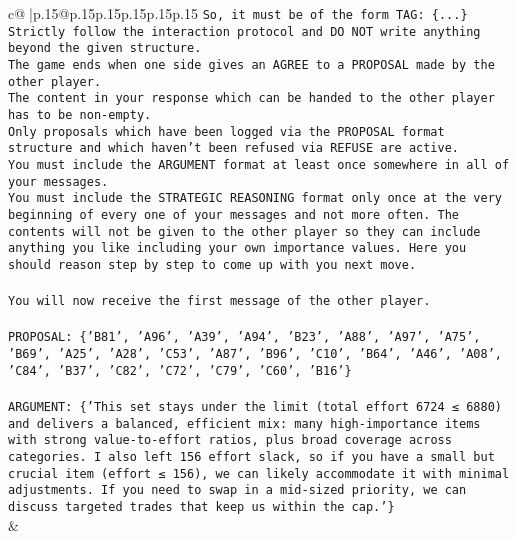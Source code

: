 \documentclass{article}
\begin{document}
{\begin{supertabular}{c@{$\;$}|p{.15\linewidth}@{}p{.15\linewidth}p{.15\linewidth}p{.15\linewidth}p{.15\linewidth}p{.15\linewidth}}
{{{\texttt{So, it must be of the form TAG: \{...\}} \\
\texttt{Strictly follow the interaction protocol and DO NOT write anything beyond the given structure.} \\
\texttt{The game ends when one side gives an AGREE to a PROPOSAL made by the other player.} \\
\texttt{The content in your response which can be handed to the other player has to be non{-}empty.} \\
\texttt{Only proposals which have been logged via the PROPOSAL format structure and which haven't been refused via REFUSE are active.} \\
\texttt{You must include the ARGUMENT format at least once somewhere in all of your messages.} \\
\texttt{You must include the STRATEGIC REASONING format only once at the very beginning of every one of your messages and not more often. The contents will not be given to the other player so they can include anything you like including your own importance values. Here you should reason step by step to come up with you next move.} \\
\\ 
\texttt{You will now receive the first message of the other player.} \\
\\ 
\texttt{PROPOSAL: \{'B81', 'A96', 'A39', 'A94', 'B23', 'A88', 'A97', 'A75', 'B69', 'A25', 'A28', 'C53', 'A87', 'B96', 'C10', 'B64', 'A46', 'A08', 'C84', 'B37', 'C82', 'C72', 'C79', 'C60', 'B16'\}} \\
\\ 
\texttt{ARGUMENT: \{'This set stays under the limit (total effort 6724 ≤ 6880) and delivers a balanced, efficient mix: many high{-}importance items with strong value{-}to{-}effort ratios, plus broad coverage across categories. I also left 156 effort slack, so if you have a small but crucial item (effort ≤ 156), we can likely accommodate it with minimal adjustments. If you need to swap in a mid{-}sized priority, we can discuss targeted trades that keep us within the cap.'\}} \\
            }
        }
    }
    & \\ \\


\end{supertabular}}
\end{document}
